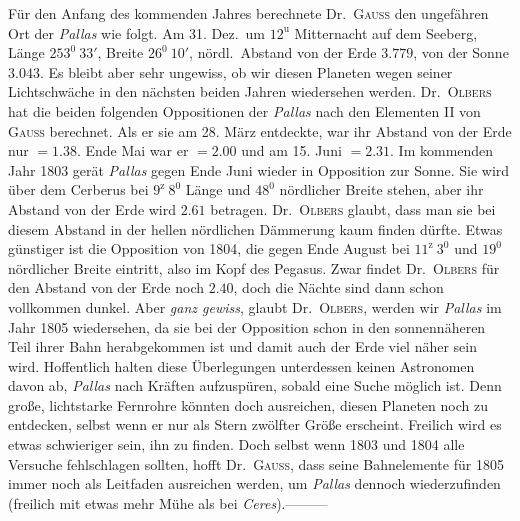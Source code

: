 Für den Anfang des kommenden Jahres berechnete Dr.\ \textsc{Gauß} den ungefähren Ort der \textit{Pallas} wie folgt. Am 31. Dez.\ um $12^{\mathrm{u}}$ Mitternacht auf dem Seeberg, Länge $253^0\ 33'$, Breite $26^0\ 10'$, nördl.\ Abstand von der Erde $3.779$, von der Sonne $3.043$. Es bleibt aber sehr ungewiss, ob wir diesen Planeten wegen seiner Lichtschwäche
%
in den nächsten beiden Jahren wiedersehen werden. Dr.\ \textsc{Olbers} hat die beiden folgenden Oppositionen der \textit{Pallas} nach den Elementen II von \textsc{Gauß} berechnet. Als er sie am 28. März entdeckte, war ihr Abstand von der Erde nur $=1.38$. Ende Mai war er $=2.00$ und am 15. Juni $=2.31$. Im kommenden Jahr 1803 gerät \textit{Pallas} gegen Ende Juni wieder in Opposition zur Sonne. Sie wird über dem Cerberus bei $9^{\mathrm{z}}\ 8^0$ Länge und $48^0$ nördlicher Breite stehen, aber ihr Abstand von der Erde wird $2.61$ betragen. Dr.\ \textsc{Olbers} glaubt, dass man sie bei diesem Abstand in der hellen nördlichen Dämmerung kaum finden dürfte. Etwas günstiger ist die Opposition von 1804, die gegen Ende August bei $11^{\mathrm{z}}\ 3^0$ und $19^0$ nördlicher Breite eintritt, also im Kopf des Pegasus. Zwar findet Dr.\ \textsc{Olbers} für den Abstand von der Erde noch $2.40$, doch die Nächte sind dann schon vollkommen dunkel. Aber \textit{ganz gewiss}, glaubt Dr.\ \textsc{Olbers}, werden wir \textit{Pallas} im Jahr 1805 wiedersehen, da sie bei der Opposition schon in den sonnennäheren Teil ihrer Bahn herabgekommen ist und damit auch der Erde viel näher sein wird. Hoffentlich halten diese Überlegungen unterdessen keinen Astronomen davon ab, \textit{Pallas} nach Kräften aufzuspüren, sobald eine Suche möglich ist. Denn große, lichtstarke Fernrohre könnten doch ausreichen, diesen Planeten noch zu entdecken, selbst wenn er nur als Stern zwölfter Größe erscheint. Freilich wird es etwas schwieriger sein, ihn zu finden. Doch selbst wenn 1803 und 1804 alle Versuche fehlschlagen sollten, hofft Dr.\ \textsc{Gauß}, dass seine Bahnelemente für 1805 immer noch als Leitfaden ausreichen werden, um \textit{Pallas} dennoch wiederzufinden (freilich mit etwas mehr Mühe als bei \textit{Ceres}).\quad —\quad —\quad —

